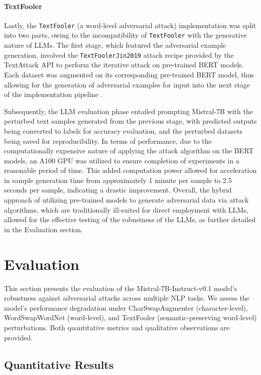 \documentclass[conference]{IEEEtran}
\begin{document}
\paragraph{TextFooler}
Lastly, the \texttt{TextFooler} (a word-level adversarial attack) implementation was split into two parts, owing to the incompatibility of \texttt{TextFooler} with the generative nature of LLMs. The first stage, which featured the adversarial example generation, involved the \texttt{TextFoolerJin2019} attack recipe provided by the TextAttack API \cite{textattack2020framework} to perform the iterative attack on pre-trained BERT models. Each dataset was augmented on its corresponding pre-trained BERT model, thus allowing for the generation of adversarial examples for input into the next stage of the implementation pipeline \cite{jin2020bertrobust}.

Subsequently, the LLM evaluation phase entailed prompting Mistral-7B with the perturbed text samples generated from the previous stage, with predicted outputs being converted to labels for accuracy evaluation, and the perturbed datasets being saved for reproducibility. In terms of performance, due to the computationally expensive nature of applying the attack algorithm on the BERT models, an A100 GPU was utilized to ensure completion of experiments in a reasonable period of time. This added computation power allowed for acceleration in sample generation time from approximately 1 minute per sample to 2.5 seconds per sample, indicating a drastic improvement. Overall, the hybrid approach of utilizing pre-trained models to generate adversarial data via attack algorithms, which are traditionally ill-suited for direct employment with LLMs, allowed for the effective testing of the robustness of the LLMs, as further detailed in the Evaluation section.


\section{Evaluation}

This section presents the evaluation of the Mistral-7B-Instruct-v0.1 model's robustness against adversarial attacks across multiple NLP tasks. We assess the model’s performance degradation under CharSwapAugmenter (character-level), WordSwapWordNet (word-level), and TextFooler (semantic-preserving word-level) perturbations. Both quantitative metrics and qualitative observations are provided.

\subsection{Quantitative Results}
\end{document}
